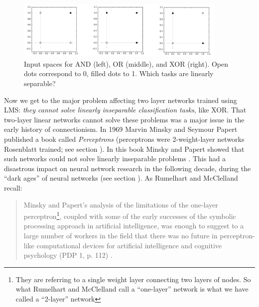 \begin{figure}[h]
\centering
\includegraphics[width=0.9\textwidth]{images/booleanInputSpaces.png}
\caption[Jeff Yoshimi.]{Input spaces for AND (left), OR (middle), and XOR (right). Open dots correspond to 0, filled dots to 1. Which tasks are linearly separable?}
\label{boolean_inputspace}
\end{figure}

Now we get to the major problem affecting two layer networks trained using LMS: \emph{they cannot solve linearly inseparable classification tasks}, like XOR. That two-layer linear networks cannot solve these problems was a major issue in the early history of connectionism. In 1969 Marvin Minsky and Seymour Papert published a book called {\em Perceptrons} (perceptrons were 2-weight-layer networks Rosenblatt trained; see section ). In this book Minsky and Papert showed that such networks could not solve linearly inseparable problems \cite{minsky1969perceptrons}. This had a disastrous impact on neural network research in the following decade, during the ``dark ages'' of neural networks (see section ). As Rumelhart and McClelland recall:

\begin{quote}
Minsky and Papert's analysis of the limitations of the one-layer perceptron\footnote{They are referring to a single weight layer connecting two layers of nodes. So what Rumelhart and McClelland call a ``one-layer'' network is what we have called a ``2-layer'' network}, coupled with some of the early successes of the symbolic processing approach in artificial intelligence, was enough to suggest to a large number of workers in the field that there was no future in perceptron-like computational devices for artificial intelligence and cognitive psychology (PDP 1, p. 112) \cite{rumelhart1986parallel}.
\end{quote}

